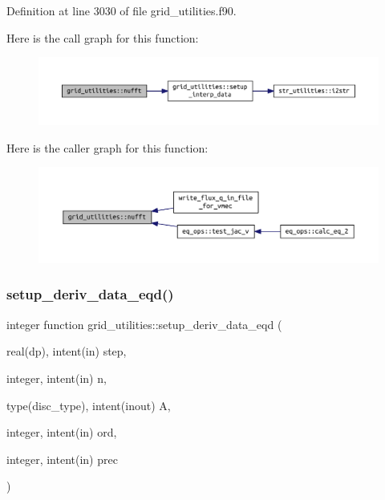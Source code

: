Definition at line 3030 of file grid\+\_\+utilities.\+f90.

Here is the call graph for this function\+:
\nopagebreak
\begin{figure}[H]
\begin{center}
\leavevmode
\includegraphics[width=350pt]{namespacegrid__utilities_a0854b2d6cc61a31f68b4afe7304077a9_cgraph}
\end{center}
\end{figure}
Here is the caller graph for this function\+:
\nopagebreak
\begin{figure}[H]
\begin{center}
\leavevmode
\includegraphics[width=350pt]{namespacegrid__utilities_a0854b2d6cc61a31f68b4afe7304077a9_icgraph}
\end{center}
\end{figure}
\mbox{\label{namespacegrid__utilities_a32f5edd35f6976236b9848f56f951c83}} 
\subsubsection{\texorpdfstring{setup\+\_\+deriv\+\_\+data\+\_\+eqd()}{setup\_deriv\_data\_eqd()}}
{\footnotesize\ttfamily integer function grid\+\_\+utilities\+::setup\+\_\+deriv\+\_\+data\+\_\+eqd (\begin{DoxyParamCaption}\item[{real(dp), intent(in)}]{step,  }\item[{integer, intent(in)}]{n,  }\item[{type(disc\+\_\+type), intent(inout)}]{A,  }\item[{integer, intent(in)}]{ord,  }\item[{integer, intent(in)}]{prec }\end{DoxyParamCaption})}



